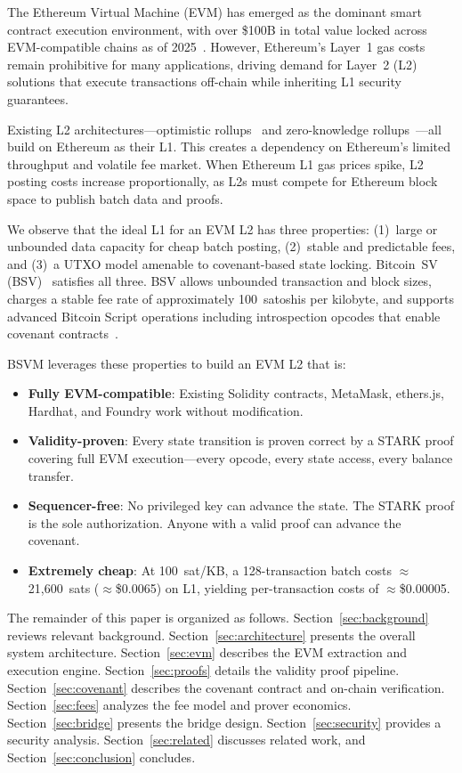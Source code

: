 \documentclass[11pt,twocolumn]{article}
\begin{document}
The Ethereum Virtual Machine (EVM) has emerged as the dominant smart contract execution environment, with over \$100B in total value locked across EVM-compatible chains as of 2025~\cite{l2beat}. However, Ethereum's Layer~1 gas costs remain prohibitive for many applications, driving demand for Layer~2 (L2) solutions that execute transactions off-chain while inheriting L1 security guarantees.

Existing L2 architectures---optimistic rollups~\cite{arbitrum,optimism} and zero-knowledge rollups~\cite{zksync,scroll,polygon_zkevm}---all build on Ethereum as their L1. This creates a dependency on Ethereum's limited throughput and volatile fee market. When Ethereum L1 gas prices spike, L2 posting costs increase proportionally, as L2s must compete for Ethereum block space to publish batch data and proofs.

We observe that the ideal L1 for an EVM L2 has three properties: (1)~large or unbounded data capacity for cheap batch posting, (2)~stable and predictable fees, and (3)~a UTXO model amenable to covenant-based state locking. Bitcoin~SV (BSV)~\cite{bsv_scaling} satisfies all three. BSV allows unbounded transaction and block sizes, charges a stable fee rate of approximately 100~satoshis per kilobyte, and supports advanced Bitcoin Script operations including introspection opcodes that enable covenant contracts~\cite{runar}.

BSVM leverages these properties to build an EVM L2 that is:

\begin{itemize}[nosep,leftmargin=1.5em]
\item \textbf{Fully EVM-compatible}: Existing Solidity contracts, MetaMask, ethers.js, Hardhat, and Foundry work without modification.
\item \textbf{Validity-proven}: Every state transition is proven correct by a STARK proof covering full EVM execution---every opcode, every state access, every balance transfer.
\item \textbf{Sequencer-free}: No privileged key can advance the state. The STARK proof is the sole authorization. Anyone with a valid proof can advance the covenant.
\item \textbf{Extremely cheap}: At 100~sat/KB, a 128-transaction batch costs $\approx$21,600~sats ($\approx$\$0.0065) on L1, yielding per-transaction costs of $\approx$\$0.00005.
\end{itemize}

The remainder of this paper is organized as follows. Section~\ref{sec:background} reviews relevant background. Section~\ref{sec:architecture} presents the overall system architecture. Section~\ref{sec:evm} describes the EVM extraction and execution engine. Section~\ref{sec:proofs} details the validity proof pipeline. Section~\ref{sec:covenant} describes the covenant contract and on-chain verification. Section~\ref{sec:fees} analyzes the fee model and prover economics. Section~\ref{sec:bridge} presents the bridge design. Section~\ref{sec:security} provides a security analysis. Section~\ref{sec:related} discusses related work, and Section~\ref{sec:conclusion} concludes.
\end{document}

